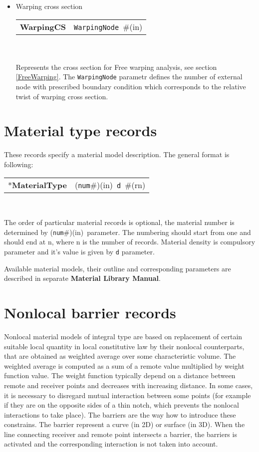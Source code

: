 \documentclass[a4paper]{report}
\newcommand{\param}[1]{\texttt{#1}} %
\newcommand{\field}[2]{\param{#1}~\#{\tiny(#2)}} %
\newcommand{\componentNum}{(\param{num}\#){\tiny(in)}} %
\newcommand{\entKeyword}[1]{*\textbf{#1}} %
\newcommand{\entKeywordInst}[1]{\textbf{#1}} %
\newenvironment{record}[1][]{\begin{tabular}{|ll}}{\end{tabular}\\}
\newcommand{\recentry}[2]{{#1}&{#2}\\}
\newcounter{rcc}
\newenvironment{record}[1][\textwidth]{\setcounter{rcc}{0}\rowcolors{1}{lightgray}{lightgray}\tabularx{#1}{llR} \hline}
               {\endtabularx}
\newcommand{\recentry}[2]{\ifthenelse{\value{rcc}>0}{$\backslash$ \\}{\setcounter{rcc}{1}}{#1}&{#2}&}
\begin{document}
\begin{itemize}
\item
Warping cross section \\
\begin{record}[0.9\textwidth]
\recentry{\entKeywordInst{WarpingCS}}{\field{WarpingNode}{in}}
\end{record}\\
Represents the cross section for Free warping analysis, see section \ref{FreeWarping}. The \param{WarpingNode} parametr defines the number of external node with prescribed boundary condition which corresponds to the relative twist of warping cross section.

\end{itemize}

\section{Material type  records}
\label{_MaterialTypeRecords}
These records specify a material model  description. The general format is
following:

\noindent
\begin{record}
  \recentry{\entKeyword{MaterialType}}{\componentNum\ \field{d}{rn}}
\end{record}

The order of particular material records is optional, the material number is determined by \componentNum\ parameter.
The numbering should start from one and should end at n, where n is the number of records.
Material density is compulsory parameter and it's value is given by
\param{d} parameter.

Available material models, their outline and
corresponding parameters are described in separate \textbf{Material Library Manual}.

\section{Nonlocal barrier records}
\label{_NonlocalBarrierRecords}
Nonlocal material models of integral type are based on replacement of
certain suitable local quantity in local constitutive law by their
nonlocal counterparts, that are obtained as weighted average over
some characteristic volume. The weighted average is computed as a sum
of a remote value multiplied by weight function value. The weight
function typically depend on a distance between remote and receiver
points and decreases with increasing distance. In some cases, it is
necessary to disregard mutual interaction between some points (for
example if they are on the opposite sides of a thin notch, which
prevents the nonlocal interactions to take place). The barriers are
the way how to introduce these constrains. The barrier represent a
curve (in 2D) or surface (in 3D). When the line connecting receiver and
remote point intersects a barrier, the barriers is activated and the
corresponding interaction is not taken into account.
\end{document}
